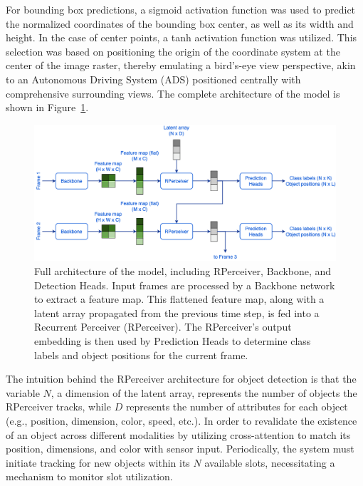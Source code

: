 For bounding box predictions, a sigmoid activation function was used to predict the normalized coordinates of the bounding box center, as well as its width and height. In the case of center points, a tanh activation function was utilized. This selection was based on positioning the origin of the coordinate system at the center of the image raster, thereby emulating a bird's-eye view perspective, akin to an Autonomous Driving System (ADS) positioned centrally with comprehensive surrounding views. The complete architecture of the model is shown in Figure~\ref{fig:figure_methods_recurrent_perceiver_complete}.

\begin{figure}
    \centering
    \includegraphics[width=\textwidth]{figures/figure_methods_recurrent_perceiver_complete.png}
    \caption{Full architecture of the model, including RPerceiver, Backbone, and Detection Heads. Input frames are processed by a Backbone network to extract a feature map. This flattened feature map, along with a latent array propagated from the previous time step, is fed into a Recurrent Perceiver (RPerceiver). The RPerceiver's output embedding is then used by Prediction Heads to determine class labels and object positions for the current frame.}
    \label{fig:figure_methods_recurrent_perceiver_complete}
\end{figure}

The intuition behind the RPerceiver architecture for object detection is that the variable $N$, a dimension of the latent array, represents the number of objects the RPerceiver tracks, while $D$ represents the number of attributes for each object (e.g., position, dimension, color, speed, etc.). In order to revalidate the existence of an object across different modalities by utilizing cross-attention to match its position, dimensions, and color with sensor input. Periodically, the system must initiate tracking for new objects within its $N$ available slots, necessitating a mechanism to monitor slot utilization.

